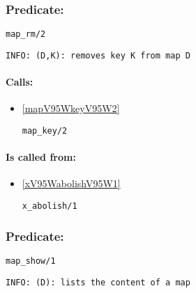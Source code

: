\subsubsection{Predicate:} \label{mapV95WrmV95W2}

\begin{verbatim}
map_rm/2
\end{verbatim}

{\small \begin{verbatim}
INFO: (D,K): removes key K from map D

\end{verbatim}}
\paragraph{Calls:} 
\begin{itemize}
\item \ref{mapV95WkeyV95W2} 
\begin{verbatim}
map_key/2
\end{verbatim}

\end{itemize}
\paragraph{Is called from:} 
\begin{itemize}
\item \ref{xV95WabolishV95W1} 
\begin{verbatim}
x_abolish/1
\end{verbatim}

\end{itemize}

\subsubsection{Predicate:} \label{mapV95WshowV95W1}

\begin{verbatim}
map_show/1
\end{verbatim}

{\small \begin{verbatim}
INFO: (D): lists the content of a map

\end{verbatim}}
